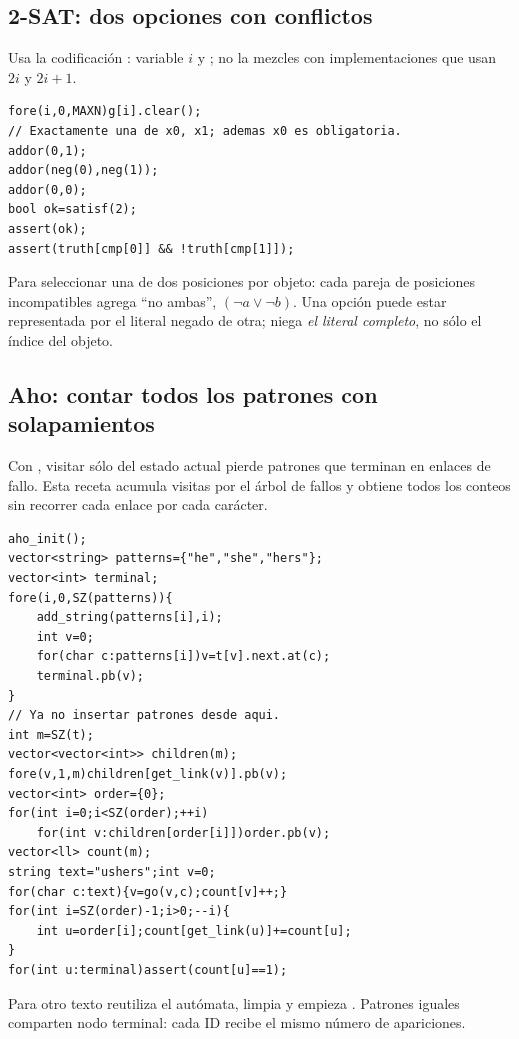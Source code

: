 \subsection{2-SAT: dos opciones con conflictos}
Usa la codificación : variable $i$ y ; no la mezcles con implementaciones que usan $2i$ y $2i+1$.
\begin{lstlisting}
fore(i,0,MAXN)g[i].clear();
// Exactamente una de x0, x1; ademas x0 es obligatoria.
addor(0,1);
addor(neg(0),neg(1));
addor(0,0);
bool ok=satisf(2);
assert(ok);
assert(truth[cmp[0]] && !truth[cmp[1]]);
\end{lstlisting}
Para seleccionar una de dos posiciones por objeto: cada pareja de posiciones incompatibles agrega ``no ambas'', $(\neg a\lor\neg b)$. Una opción puede estar representada por el literal negado de otra; niega \emph{el literal completo}, no sólo el índice del objeto.

\subsection{Aho: contar todos los patrones con solapamientos}
Con , visitar sólo  del estado actual pierde patrones que terminan en enlaces de fallo. Esta receta acumula visitas por el árbol de fallos y obtiene todos los conteos sin recorrer cada enlace por cada carácter.
\begin{lstlisting}
aho_init();
vector<string> patterns={"he","she","hers"};
vector<int> terminal;
fore(i,0,SZ(patterns)){
    add_string(patterns[i],i);
    int v=0;
    for(char c:patterns[i])v=t[v].next.at(c);
    terminal.pb(v);
}
// Ya no insertar patrones desde aqui.
int m=SZ(t);
vector<vector<int>> children(m);
fore(v,1,m)children[get_link(v)].pb(v);
vector<int> order={0};
for(int i=0;i<SZ(order);++i)
    for(int v:children[order[i]])order.pb(v);
vector<ll> count(m);
string text="ushers";int v=0;
for(char c:text){v=go(v,c);count[v]++;}
for(int i=SZ(order)-1;i>0;--i){
    int u=order[i];count[get_link(u)]+=count[u];
}
for(int u:terminal)assert(count[u]==1);
\end{lstlisting}
Para otro texto reutiliza el autómata, limpia  y empieza . Patrones iguales comparten nodo terminal: cada ID recibe el mismo número de apariciones.

